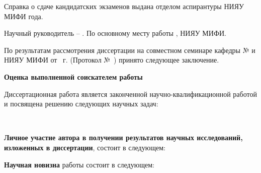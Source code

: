     Справка о сдаче кандидатских экзаменов выдана отделом аспирантуры НИЯУ МИФИ  года.

    Научный руководитель –  . По основному месту работы ,  НИЯУ МИФИ.

    По результатам рассмотрения диссертации  на совместном семинаре кафедры №  и  НИЯУ МИФИ от ~г. (Протокол №~) принято следующее заключение.

    \vspace{3mm}
    
    \textbf{Оценка выполненной соискателем работы}
    
    \vspace{3mm}

    Диссертационная работа   является законченной научно-квалификационной работой и посвящена решению следующих научных задач: 

    \begin{enumerate}
        {%
            \item {}\
        }
    \end{enumerate}

    \vspace{3mm}

    \textbf{Личное участие автора в получении результатов научных исследований, изложенных в диссертации}, состоит в следующем:

    
    \vspace{3mm}

    \textbf{Научная новизна} работы состоит в следующем:

    \vspace{3mm}

    \begin{enumerate}
        {%
            \item {}\
        }
    \end{enumerate}

